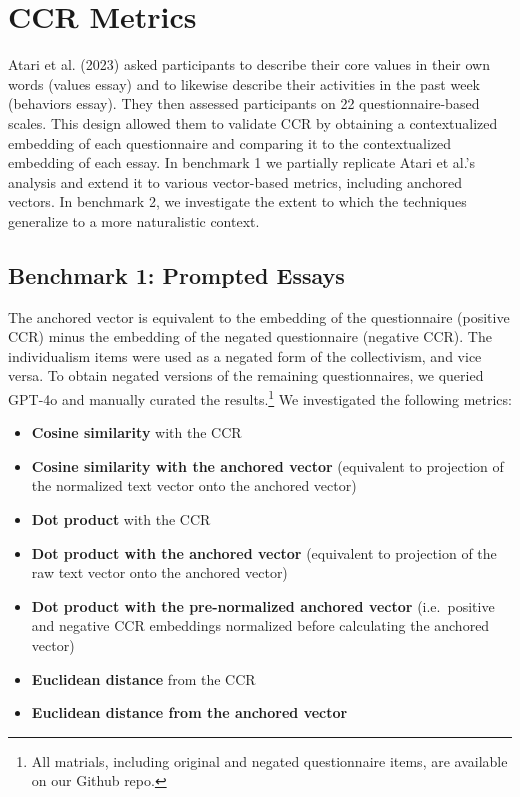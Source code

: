 \documentclass[
  man,
  floatsintext,
  longtable,
  nolmodern,
  notxfonts,
  notimes,
  colorlinks=true,linkcolor=blue,citecolor=blue,urlcolor=blue]{apa7}
\providecommand{\tightlist}{%
  \setlength{\itemsep}{0pt}\setlength{\parskip}{0pt}}
\begin{document}
\section{CCR Metrics}\label{ccr-metrics}

Atari et al. (2023) asked participants to describe their core values in
their own words (values essay) and to likewise describe their activities
in the past week (behaviors essay). They then assessed participants on
22 questionnaire-based scales. This design allowed them to validate CCR
by obtaining a contextualized embedding of each questionnaire and
comparing it to the contextualized embedding of each essay. In benchmark
1 we partially replicate Atari et al.'s analysis and extend it to
various vector-based metrics, including anchored vectors. In benchmark
2, we investigate the extent to which the techniques generalize to a
more naturalistic context.

\subsection{Benchmark 1: Prompted
Essays}\label{benchmark-1-prompted-essays}

The anchored vector is equivalent to the embedding of the questionnaire
(positive CCR) minus the embedding of the negated questionnaire
(negative CCR). The individualism items were used as a negated form of
the collectivism, and vice versa. To obtain negated versions of the
remaining questionnaires, we queried GPT-4o and manually curated the
results.\footnote{All matrials, including original and negated
  questionnaire items, are available on our Github repo.} We
investigated the following metrics:

\begin{itemize}
\tightlist
\item
  \textbf{Cosine similarity} with the CCR
\item
  \textbf{Cosine similarity with the anchored vector} (equivalent to
  projection of the normalized text vector onto the anchored vector)
\item
  \textbf{Dot product} with the CCR
\item
  \textbf{Dot product with the anchored vector} (equivalent to
  projection of the raw text vector onto the anchored vector)
\item
  \textbf{Dot product with the pre-normalized anchored vector}
  (i.e.~positive and negative CCR embeddings normalized before
  calculating the anchored vector)
\item
  \textbf{Euclidean distance} from the CCR
\item
  \textbf{Euclidean distance from the anchored vector}
\end{itemize}
\end{document}

